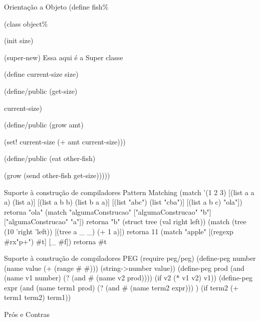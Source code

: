 \documentclass{beamer}
\begin{document}
\begin{frame}{Orientação a Objeto}
(define fish\%

  (class object\%
  
    (init size) 
    
    (super-new) Essa aqui é a Super classe
    
    (define current-size size)
    
    (define/public (get-size)
    
      current-size)
      
    (define/public (grow amt)
    
      (set! current-size (+ amt current-size)))
      
    (define/public (eat other-fish)
    
      (grow (send other-fish get-size)))))


\end{frame}


\begin{frame}{Suporte à construção de compiladores}
Pattern Matching
(match '(1 2 3) 
      [(list a a a) (list a)]
      [(list a b b) (list b a a)]
      [(list "abc") (list "cba")]
      [(list a b c) "ola"]) retorna "ola"
 (match "algumaConstrucao" ["algumaConstrucao" "b"] ["algumaConstrucao" "a"]) retorna "b"
 (struct tree (val right left))
 (match (tree (10 'right 'left)) [(tree a _ _) (+ 1 a)]) retorna 11
 (match "apple" [(regexp #rx"p+") #t] [_ #f])  retorna #t
\end{frame}




\begin{frame}{Suporte à construção de compiladores}
PEG
(require peg/peg)
(define-peg number
            (name value (+ (range #\0 #\9)))
            (string->number value))
(define-peg prod
            (and (name v1 number) (? (and #\* (name v2 prod))))
            (if v2 (* v1 v2) v1))
(define-peg expr
            (and (name term1 prod) (? (and #\+ (name term2 expr))) )
            (if term2 (+ term1 term2) term1))
\end{frame}


\begin{frame}{Prós e Contras}

\end{frame}
\end{document}
